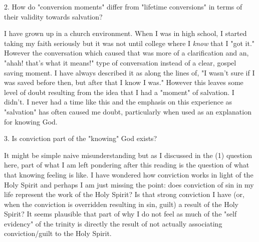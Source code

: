 \documentclass[12pt]{turabian-researchpaper}
\begin{document}
2. How do "conversion moments" differ from "lifetime conversions" in terms of their validity towards salvation?

I have grown up in a church environment. When I was in high school, I started taking my faith seriously but it was not until college where I \textit{know} that I "got it." However the conversation which caused that was more of a clarification and an, "ahah! that's what it means!" type of conversation instead of a clear, gospel saving moment. I have always described it as along the lines of, "I wasn't sure if I was saved before then, but after that I know I was." However this leaves some level of doubt resulting from the idea that I had a "moment" of salvation. I didn't. I never had a time like this and the emphasis on this experience as "salvation" has often caused me doubt, particularly when used as an explanation for knowing God.

3. Is conviction part of the "knowing" God exists?

It might be simple naive misunderstanding but as I discussed in the (1) question here, part of what I am left pondering after this reading is the question of what that knowing feeling is like. I have wondered how conviction works in light of the Holy Spirit and perhaps I am just missing the point: does conviction of sin in my life represent the work of the Holy Spirit? Is that strong conviction I have (or, when the conviction is overridden resulting in sin, guilt) a result of the Holy Spirit? It seems plausible that part of why I do not feel as much of the "self evidency" of the trinity is directly the result of not actually associating conviction/guilt to the Holy Spirit.
\newpage
\printbibliography
\end{document}
